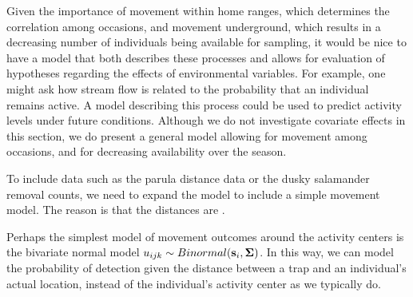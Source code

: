 Given the importance of movement within home ranges, which determines
the correlation among occasions, and movement underground, which
results in a decreasing number of individuals being available for
sampling, it would be nice to have a model that both describes these
processes and allows for evaluation of hypotheses regarding the
effects of environmental variables. For example, one might ask how
stream flow is related to the probability that an individual remains
active. A model describing this process could be used to predict
activity levels under future conditions. Although we do not
investigate covariate effects in this section, we do present a general
model allowing for movement among occasions, and for decreasing
availability over the season.

To include data such as the parula distance data or the dusky
salamander removal counts, we need to expand the model to include a
simple movement model. The reason is that the distances are .

Perhaps the simplest model of movement outcomes around the activity
centers is the bivariate normal model
$u_{ijk} \sim Binormal({\bf s}_i, {\bf \Sigma})$.
In this way, we can model the probability of detection given the
distance between a trap and an individual's actual location, instead
of the individual's activity center as we typically do.




